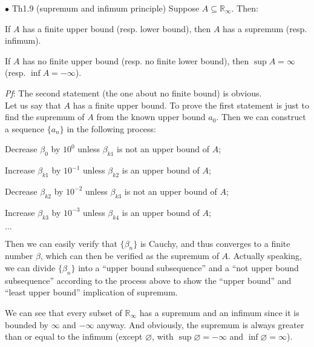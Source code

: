\documentclass{article}
\begin{document}
\begin{Th}{$\bullet$ Th1.9 (supremum and infimum principle)}
    Suppose $A\subseteq\mathbb{R}_{\infty}$. Then:
    \begin{compactenum}
        \item If $A$ has a finite upper bound (resp. lower bound), then $A$ has a supremum (resp. infimum).
        \item If $A$ has no finite upper bound (resp. no finite lower bound), then $\sup A=\infty$ (resp. $\inf A=-\infty$).
    \end{compactenum}
    \tcblower
    \textit{Pf}: The second statement (the one about no finite bound) is obvious.\\
    Let us say that $A$ has a finite upper bound. To prove the first statement is just to find the supremum of $A$ from the known upper bound $a_0$. Then we can construct a sequence $\{a_n\}$ in the following process:
        \begin{compactenum}
            \item Decrease $\beta_0$ by $10^0$ unless $\beta_{k1}$ is not an upper bound of $A$;
            \item Increase $\beta_{k1}$ by $10^{-1}$ unless $\beta_{k2}$ is an upper bound of $A$;
            \item Decrease $\beta_{k2}$ by $10^{-2}$ unless $\beta_{k3}$ is not an upper bound of $A$;
            \item Increase $\beta_{k3}$ by $10^{-3}$ unless $\beta_{k4}$ is an upper bound of $A$;
            \item $\dots$
        \end{compactenum}
    Then we can easily verify that $\{\beta_n\}$ is Cauchy, and thus converges to a finite number $\beta$, which can then be verified as the supremum of $A$. Actually speaking, we can divide $\{\beta_n\}$ into a ``upper bound subsequence'' and a ``not upper bound subsequence'' according to the process above to show the ``upper bound'' and ``least upper bound'' implication of supremum.
\end{Th}

\begin{Rmk}{}
    We can see that \textcolor{Th}{every subset of $\mathbb{R}_\infty$ has a supremum and an infimum} since it is bounded by $\infty$ and $-\infty$ anyway. And obviously, \textcolor{Th}{the supremum is always greater than or equal to the infimum (except $\varnothing$, with $\sup\varnothing = -\infty$ and $\inf\varnothing = \infty$).}
\end{Rmk}
\end{document}
